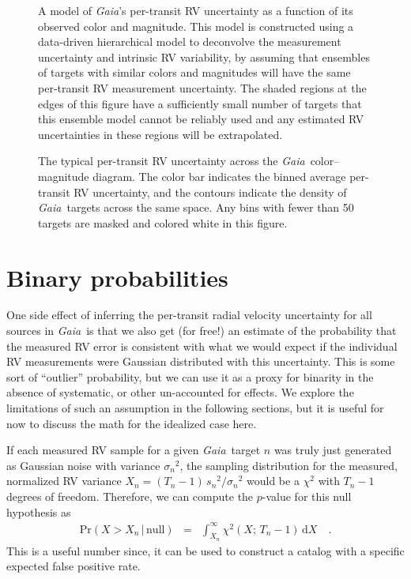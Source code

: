 \documentclass[modern, letterpaper]{aastex63}
\newcommand{\project}[1]{\textsl{#1}}
\newcommand{\Gaia}{\project{Gaia}}
\newcommand{\dd}{\ensuremath{\,\mathrm{d}}}
\begin{document}
\begin{figure}
	\caption{A model of \Gaia's per-transit RV uncertainty as a function of its observed color and magnitude.
		This model is constructed using a data-driven hierarchical model to deconvolve the measurement uncertainty and intrinsic RV variability, by assuming that ensembles of targets with similar colors and magnitudes will have the same per-transit RV measurement uncertainty.
		The shaded regions at the edges of this figure have a sufficiently small number of targets that this ensemble model cannot be reliably used and any estimated RV uncertainties in these regions will be extrapolated. \label{fig:noise_model}}
\end{figure}

\begin{figure}
	\caption{The typical per-transit RV uncertainty across the \Gaia\ color--magnitude diagram.
		The color bar indicates the binned average per-transit RV uncertainty, and the contours indicate the density of \Gaia\ targets across the same space.
		Any bins with fewer than 50 targets are masked and colored white in this figure. \label{fig:sigma_cmd}}
\end{figure}

\section{Binary probabilities}

One side effect of inferring the per-transit radial velocity uncertainty for all sources in \Gaia\ is that we also get (for free!) an estimate of the probability that the measured RV error is consistent with what we would expect if the individual RV measurements were Gaussian distributed with this uncertainty.
This is some sort of ``outlier'' probability, but we can use it as a proxy for binarity in the absence of systematic, or other un-accounted for effects.
We explore the limitations of such an assumption in the following sections, but it is useful for now to discuss the math for the idealized case here.

If each measured RV sample for a given \Gaia\ target $n$ was truly just generated as Gaussian noise with variance ${\sigma_n}^2$, the sampling distribution for the measured, normalized RV variance $X_n = (T_n - 1)\,{s_n}^2 / {\sigma_n}^2$ would be a $\chi^2$ with $T_n - 1$ degrees of freedom.
Therefore, we can compute the $p$-value for this null hypothesis as
\begin{eqnarray}
	\mathrm{Pr}(X > X_n\,|\,\mathrm{null}) &=& \int_{X_n}^\infty \chi^2 (X;\,T_n-1) \dd X \quad.
\end{eqnarray}
This is a useful number since, it can be used to construct a catalog with a specific expected false positive rate.
\end{document}
